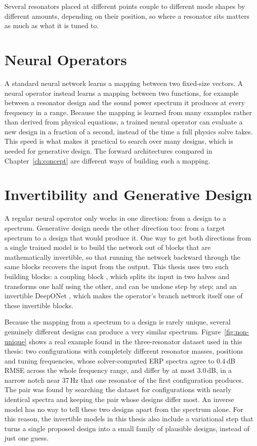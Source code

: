 Several resonators placed at different points couple to different mode shapes by different amounts, depending on their position, so where a resonator sits matters as much as what it is tuned to.

\section{Neural Operators}

A standard neural network learns a mapping between two fixed-size vectors. A neural operator \parencite{kovachki2023neural} instead learns a mapping between two functions, for example between a resonator design and the sound power spectrum it produces at every frequency in a range. Because the mapping is learned from many examples rather than derived from physical equations, a trained neural operator can evaluate a new design in a fraction of a second, instead of the time a full physics solve takes. This speed is what makes it practical to search over many designs, which is needed for generative design. The forward architectures compared in Chapter~\ref{ch:concept} are different ways of building such a mapping.

\section{Invertibility and Generative Design}

A regular neural operator only works in one direction: from a design to a spectrum. Generative design needs the other direction too: from a target spectrum to a design that would produce it. One way to get both directions from a single trained model is to build the network out of blocks that are mathematically invertible, so that running the network backward through the same blocks recovers the input from the output. This thesis uses two such building blocks: a coupling block \parencite{dinh2017realnvp}, which splits its input in two halves and transforms one half using the other, and can be undone step by step; and an invertible DeepONet \parencite{kaltenbach2023invertible}, which makes the operator's branch network itself one of these invertible blocks.

Because the mapping from a spectrum to a design is rarely unique, several genuinely different designs can produce a very similar spectrum. Figure~\ref{fig:non-unique} shows a real example found in the three-resonator dataset used in this thesis: two configurations with completely different resonator masses, positions and tuning frequencies, whose solver-computed ERP spectra agree to 0.4\,dB RMSE across the whole frequency range, and differ by at most 3.0\,dB, in a narrow notch near 37\,Hz that one resonator of the first configuration produces. The pair was found by searching the dataset for configurations with nearly identical spectra and keeping the pair whose designs differ most. An inverse model has no way to tell these two designs apart from the spectrum alone. For this reason, the invertible models in this thesis also include a variational step that turns a single proposed design into a small family of plausible designs, instead of just one guess.

